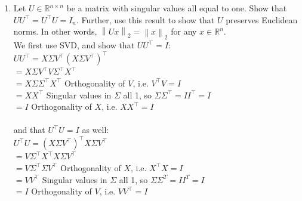 \documentclass{article}
\newcommand{\field}[1]{\mathbb{#1}}
\newcommand{\1}{\mathbf{1}}
\newcommand{\R}{\field{R}} %
\newcommand{\norm}[1]{\left\|#1\right\|}
\newcommand{\twonorm}[1]{\|#1\|_2^2}
\begin{document}
{\begin{enumerate}
  Ridge Regression: \\
  $\min_w \twonorm{X w - y} + \lambda \twonorm{w}$ \\
  $= \min_w (Xw - y)^\top(Xw-y) + \lambda w^\top w$ \\
  $\widehat{w}_{\rm R} = (X^\top X + \lambda I)^{-1} X^\top y$ \\
  $= ((UDV^\top)^\top UDV^\top + \lambda I)^{-1} (UDV^\top)^\top y$ \\
  $= (VDU^\top UDV^\top + \lambda I)^{-1} VDU^\top y$ \\
  $= (VD^2V^\top + \lambda V V^\top)^{-1} VDU^\top y$ \\
  $= (V(D^2 + \lambda) V^\top)^{-1} VDU^\top y$ \\
  $= V(D^2 + \lambda)^{-1} V^\top VDU^\top y$ \\
  $= V(D^2 + \lambda)^{-1} DU^\top y$ \\

  We note that the largest difference is that in $\widehat{w}$, our $D$-term is $D^{-1}$, while in $\widehat{w}_{\rm R}$, our $D$-term is $(D^2 + \lambda)^{-1}D$. We can compare this by transforming $D^{-1} = D^{-2}D$. The addition of a positive $\lambda$ term essentially shrinks this parameter and the overall $w$-solutions by increasing the factor by which we are dividing the $D$-term (and therefore overall term as well).

  \item Let $U \in \R^{n\times n}$ be a matrix with singular values all equal to one. Show that $UU^\top = U^\top U = I_n$. Further, use this result to show that $U$ preserves Euclidean norms. In other words, $\norm{U x}_2 = \norm{x}_2$ for any $x\in \R^n$. \\
  
  We first use SVD, and show that $UU^\top = I$: \\ 
  $UU^\top = X \Sigma V^\top (X \Sigma V^\top)^\top$ \\
  $= X \Sigma V^\top V \Sigma^\top X^\top$ \\
  $= X \Sigma \Sigma^\top X^\top$ \hfill Orthogonality of $V$, i.e. $V^\top V = I$ \\
  $= X X^\top$ \hfill Singular values in $\Sigma$ all 1, so $\Sigma \Sigma^\top = I I^\top = I$ \\
  $= I$ \hfill Orthogonality of $X$, i.e. $X X^\top = I$ \\ \\
  and that $U^\top U = I$ as well: \\
  $U^\top U = (X \Sigma V^\top)^\top X \Sigma V^\top$ \\
  $= V \Sigma^\top X^\top X \Sigma V^\top$ \\
  $= V \Sigma^\top \Sigma V^\top$ \hfill Orthogonality of $X$, i.e. $X^\top X = I$ \\
  $= V V^\top$ \hfill Singular values in $\Sigma$ all 1, so $\Sigma \Sigma^T = I I^T = I$ \\
  $= I$ \hfill Orthogonality of $V$, i.e. $V V^\top = I$ \\ \\


\end{enumerate}}
\end{document}
